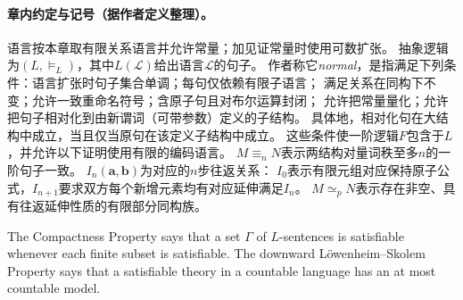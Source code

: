 
\paragraph{章内约定与记号（据作者定义整理）。}
语言按本章取有限关系语言并允许常量；加见证常量时使用可数扩张。
抽象逻辑为$(L,\models_L)$，其中$L(\mathcal L)$给出语言$\mathcal L$的句子。
作者称它\emph{normal}，是指满足下列条件：语言扩张时句子集合单调；每句仅依赖有限子语言；
满足关系在同构下不变；允许一致重命名符号；含原子句且对布尔运算封闭；
允许把常量量化；允许把句子相对化到由新谓词（可带参数）定义的子结构。
具体地，相对化句在大结构中成立，当且仅当原句在该定义子结构中成立。
这些条件使一阶逻辑$F$包含于$L$，并允许以下证明使用有限的编码语言。
$M\equiv_nN$表示两结构对量词秩至多$n$的一阶句子一致。
$I_n(\mathbf a,\mathbf b)$为对应的$n$步往返关系：
$I_0$表示有限元组对应保持原子公式，$I_{n+1}$要求双方每个新增元素均有对应延伸满足$I_n$。
$M\simeq_pN$表示存在非空、具有往返延伸性质的有限部分同构族。

\begin{definition}
The Compactness Property says that a set $\Gamma$ of $L$-sentences is
satisfiable whenever each finite subset is satisfiable.
The downward L\"owenheim--Skolem Property says that a satisfiable theory
in a countable language has an at most countable model.
\end{definition}

